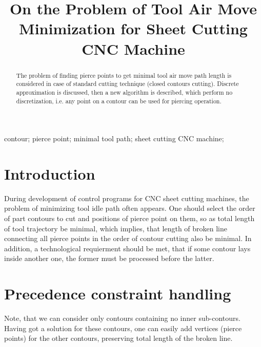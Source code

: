 \documentclass{../download/tPRS2e}
\begin{document}
\title{On the Problem of Tool Air Move Minimization for Sheet Cutting CNC Machine}

\author{
}

\maketitle

\begin{abstract}
The problem of finding pierce points to get
minimal tool air move path length is considered
in case of standard cutting technique
(closed contours cutting).
Discrete approximation is discussed,
then a new algorithm is described,
which perform no discretization,
i.e. any point on a contour can be 
used for piercing operation.
\end{abstract}

\begin{keywords}
    contour;
    pierce point;
    minimal tool path;
    sheet cutting CNC machine;
\end{keywords}

\section{Introduction}

During development of control programs for
CNC sheet cutting machines,
the problem of minimizing tool idle path
often appears.
One should select the order
of part contours to cut
and positions of pierce point on them,
so as total length of tool trajectory be minimal,
which implies,
that length of broken line connecting all
pierce points in the order of contour cutting
also be minimal.
In addition, a technological requierment should be met,
that if some contour lays inside another one,
the former must be processed before the latter.

\section{Precedence constraint handling}

Note, that we can consider
only contours containing no inner sub-contours.
Having got a solution for these contours,
one can easily add vertices
(pierce points) for the other contours,
preserving total length of the broken line.
\end{document}
